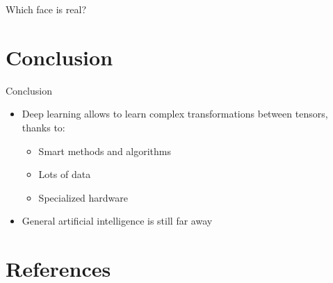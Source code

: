 \documentclass[xcolor=pdftex,dvipsnames,table,mathserif]{beamer}
\begin{document}
\begin{frame}{Which face is real?}


\end{frame}


\section{Conclusion}

\begin{frame}{Conclusion}

\begin{itemize}
\item Deep learning allows to learn complex transformations between tensors, thanks to:
  \begin{itemize}
  \item Smart methods and algorithms
  \item Lots of data
  \item Specialized hardware
  \end{itemize}
  \item General artificial intelligence is still far away
\end{itemize}

\end{frame}




\section*{References}


\end{document}

